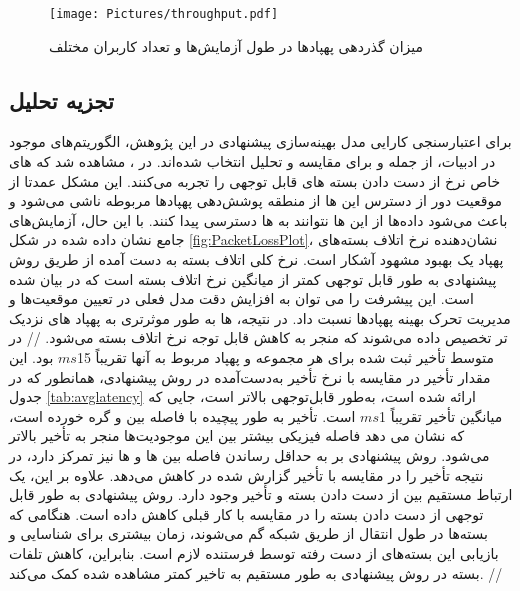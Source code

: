 
\begin{figure}%
	\centering
	\texttt{[image: Pictures/throughput.pdf]}
	\caption{میزان گذردهی پهپاد‌ها در طول آزمایش‌ها و تعداد کاربران مختلف}
	\label{fig:Throughput}
\end{figure}
\subsection{تجزیه تحلیل}\label{subsection:referencecompare}
برای اعتبارسنجی کارایی مدل بهینه‌سازی پیشنهادی در این پژوهش، الگوریتم‌های موجود در ادبیات، از جمله \cite{Pasandideh2023} و \cite{8892933} برای مقایسه و تحلیل انتخاب شده‌اند.
در \cite{Pasandideh2023}، مشاهده شد که های خاص نرخ از دست دادن بسته های قابل توجهی را تجربه می‌کنند. این مشکل عمدتا از موقعیت دور از دسترس این ها از منطقه پوشش‌دهی پهپادها مربوطه ناشی می‌شود و باعث می‌شود داده‌ها از این ها نتوانند به ها دسترسی پیدا کنند. با این حال، آزمایش‌های جامع نشان داده شده در شکل \ref{fig:PacketLossPlot}، نشان‌دهنده نرخ اتلاف بسته‌های پهپاد یک بهبود مشهود آشکار است. نرخ کلی اتلاف بسته به دست آمده از طریق روش پیشنهادی به طور قابل توجهی کمتر از میانگین نرخ اتلاف بسته است که در \cite{Pasandideh2023} بیان شده است. این پیشرفت را می توان به افزایش دقت مدل فعلی در تعیین موقعیت‌ها و مدیریت تحرک بهینه پهپادها نسبت داد. در نتیجه، ها به طور موثرتری به پهپاد های نزدیک تر تخصیص داده می‌شوند که منجر به کاهش قابل توجه نرخ اتلاف بسته می‌شود.
//
در \cite{Pasandideh2023} متوسط ​​تأخیر ثبت شده برای هر مجموعه  و پهپاد مربوط به آنها تقریباً 15$ms$ بود. این مقدار تأخیر در مقایسه با نرخ تأخیر به‌دست‌آمده در روش پیشنهادی، همانطور که در جدول \ref{tab:avglatency} ارائه شده است، به‌طور قابل‌توجهی بالاتر است، جایی که میانگین تأخیر تقریباً 1$ms$ است. تأخیر به طور پیچیده با فاصله بین  و  گره خورده است، که نشان می دهد فاصله فیزیکی بیشتر بین این موجودیت‌ها منجر به تأخیر بالاتر می‌شود. روش پیشنهادی بر به حداقل رساندن فاصله بین ‌ها و ها نیز تمرکز دارد، در نتیجه تأخیر را در مقایسه با تأخیر گزارش شده در \cite{Pasandideh2023} کاهش می‌دهد. علاوه بر این، یک ارتباط مستقیم بین از دست دادن بسته و تأخیر وجود دارد. روش پیشنهادی به طور قابل توجهی از دست دادن بسته را در مقایسه با کار قبلی کاهش داده است. هنگامی که بسته‌ها در طول انتقال از طریق شبکه گم می‌شوند، زمان بیشتری برای شناسایی و بازیابی این بسته‌های از دست رفته توسط فرستنده لازم است. بنابراین، کاهش تلفات بسته در روش پیشنهادی به طور مستقیم به تاخیر کمتر مشاهده شده کمک می‌کند.
//
